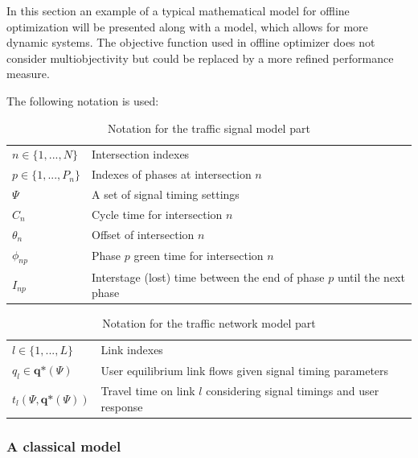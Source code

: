 \label{model}
In this section an example of a typical mathematical model for offline optimization will be presented along with a model, which allows for more dynamic systems. The objective function used in offline optimizer does not consider multiobjectivity but could be replaced by a more refined performance measure.

The following notation is used:

\begin{table}[!ht]
\begin{center}
\begin{tabular}{ll}
\hline
$n \in \lbrace 1,...,N \rbrace$ & Intersection indexes \\
$p \in \lbrace 1,...,P_n \rbrace$ & Indexes of phases at intersection $n$ \\ 
$\Psi$ & A set of signal timing settings \\
$C_n$ & Cycle time for intersection $n$ \\
$\theta_n$ & Offset of intersection $n$ \\
$\phi_{np}$ & Phase $p$ green time for intersection $n$  \\
$I_{np}$ & Interstage (lost) time between the end of phase $p$ until the next phase  \\
\hline
\end{tabular}
\end{center}
\caption{Notation for the traffic signal model part}
\end{table}

\begin{table}[!ht]
\begin{center}
\begin{tabular}{ll}
\hline
$l \in \lbrace 1,...,L \rbrace$ & Link indexes \\
$q_l \in \textbf{q*}(\Psi)$ & User equilibrium link flows given signal timing parameters  \\
$t_l(\Psi,\textbf{q*}(\Psi))$ & Travel time on link $l$ considering signal timings and user response \\
\hline
\end{tabular}
\end{center}
\caption{Notation for the traffic network model part}
\end{table}

\subsubsection*{A classical model}


